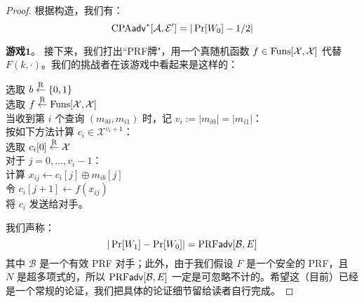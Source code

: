 \begin{proof}
\vspace{5pt}

根据构造，我们有：
\begin{equation}\label{eq:5-24}
{\rm CPA}\mathsf{adv}^*[\mathcal{A},\mathcal{E}']= |\Pr[W_0]-{1}/{2}|
\end{equation}


\noindent\textbf{游戏$\mathbf{1}$}。
接下来，我们打出``PRF牌"，用一个真随机函数 $f\in{\rm Funs}[\mathcal{X},\mathcal{X}]$ 代替 $F(k,\cdot)$。我们的挑战者在该游戏中看起来是这样的：

\vspace{5pt}

\hspace*{5pt} 选取 $b\overset{\rm R}\leftarrow\{0,1\}$\\
\hspace*{26pt} 选取 $f\overset{\rm R}\leftarrow{\rm Funs}[\mathcal{X},\mathcal{X}]$\\
\hspace*{26pt} 当收到第 $i$ 个查询 $(m_{i0},m_{i1})$ 时，记 $v_i:=|m_{i0}|=|m_{i1}|$：\\
\hspace*{50pt} 按如下方法计算 $c_i\in\mathcal{X}^{v_i+1}$：\\
\hspace*{75pt} 选取 $c_i[0]\overset{\rm R}\leftarrow\mathcal{X}$\\
\hspace*{75pt} 对于 $j=0,\dots,v_i-1$：\\
\hspace*{100pt} 计算 $x_{ij}\leftarrow c_i[j]\oplus m_{ib}[j]$\\
\hspace*{100pt} 令 $c_i[j+1]\leftarrow f(x_{ij})$\\
\hspace*{50pt} 将 $c_i$ 发送给对手。

\vspace{5pt}

我们声称：
\begin{equation}\label{eq:5-25}
|\Pr[W_1]-\Pr[W_0]|={\rm PRF}\mathsf{adv}[\mathcal{B},E]
\end{equation}
其中 $\mathcal{B}$ 是一个有效 PRF 对手；此外，由于我们假设 $F$ 是一个安全的 PRF，且 $N$ 是超多项式的，所以 ${\rm PRF}\mathsf{adv}[\mathcal{B},E]$ 一定是可忽略不计的。希望这（目前）已经是一个常规的论证，我们把具体的论证细节留给读者自行完成。

\vspace{5pt}


\end{proof}
